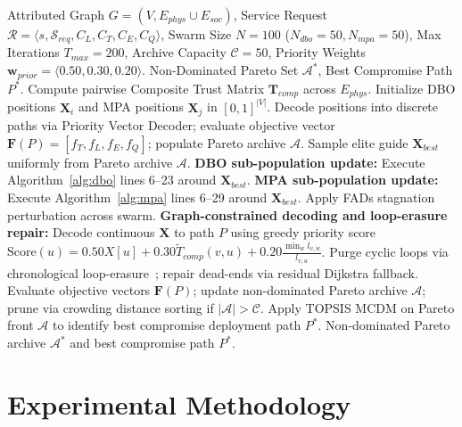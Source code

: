 \documentclass[journal,compsoc]{IEEEtran}
\begin{document}
\begin{algorithm}[!t]
\caption{Proposed Hybrid HDBO-MPA Service Discovery Framework}
\label{alg:hdbo_mpa}
\begin{algorithmic}[1]
\REQUIRE Attributed Graph $G = (V, E_{phys} \cup E_{soc})$, Service Request $\mathcal{R} = \langle s, \mathcal{S}_{req}, C_L, C_T, C_E, C_Q \rangle$, Swarm Size $N = 100$ ($N_{dbo}=50, N_{mpa}=50$), Max Iterations $T_{max} = 200$, Archive Capacity $\mathcal{C} = 50$, Priority Weights $\mathbf{w}_{prior} = \langle 0.50, 0.30, 0.20 \rangle$.
\ENSURE Non-Dominated Pareto Set $\mathcal{A}^*$, Best Compromise Path $P^*$.
\STATE Compute pairwise Composite Trust Matrix $\mathbf{T}_{comp}$ across $E_{phys}$.
\STATE Initialize DBO positions $\mathbf{X}_i$ and MPA positions $\mathbf{X}_j$ in $[0, 1]^{|V|}$.
\STATE Decode positions into discrete paths via Priority Vector Decoder; evaluate objective vector $\mathbf{F}(P) = [f_T, f_L, f_E, f_Q]$; populate Pareto archive $\mathcal{A}$.
    \STATE Sample elite guide $\mathbf{X}_{best}$ uniformly from Pareto archive $\mathcal{A}$.
    \STATE \textbf{DBO sub-population update:} Execute Algorithm~\ref{alg:dbo} lines 6--23 around $\mathbf{X}_{best}$.
    \STATE \textbf{MPA sub-population update:} Execute Algorithm~\ref{alg:mpa} lines 6--29 around $\mathbf{X}_{best}$.
        \STATE Apply FADs stagnation perturbation across swarm.
    \ENDIF
    \STATE \textbf{Graph-constrained decoding and loop-erasure repair:}
        \STATE Decode continuous $\mathbf{X}$ to path $P$ using greedy priority score $\text{Score}(u) = 0.50 X[u] + 0.30 \widetilde{T}_{comp}(v, u) + 0.20 \frac{\min_w l_{v,w}}{l_{v,u}}$.
        \STATE Purge cyclic loops via chronological loop-erasure~\cite{jarai2020toppling}; repair dead-ends via residual Dijkstra fallback.
    \ENDFOR
    \STATE Evaluate objective vectors $\mathbf{F}(P)$; update non-dominated Pareto archive $\mathcal{A}$; prune via crowding distance sorting if $|\mathcal{A}| > \mathcal{C}$.
\ENDFOR
\STATE Apply TOPSIS MCDM on Pareto front $\mathcal{A}$ to identify best compromise deployment path $P^*$.
\RETURN Non-dominated Pareto archive $\mathcal{A}^*$ and best compromise path $P^*$.
\end{algorithmic}
\end{algorithm}

\section{Experimental Methodology}
\end{document}
